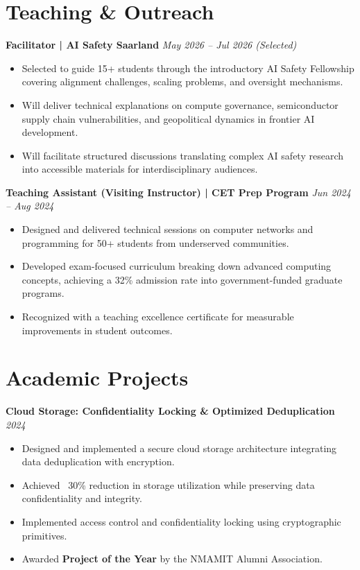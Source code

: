 \documentclass[a4paper,11pt]{article}
\begin{document}
\section{Teaching \& Outreach}
\textbf{Facilitator | AI Safety Saarland} \hfill \textit{May 2026 -- Jul 2026 (Selected)}
\begin{itemize}
    \item Selected to guide 15+ students through the introductory AI Safety Fellowship covering alignment challenges, scaling problems, and oversight mechanisms.
    \item Will deliver technical explanations on compute governance, semiconductor supply chain vulnerabilities, and geopolitical dynamics in frontier AI development.
    \item Will facilitate structured discussions translating complex AI safety research into accessible materials for interdisciplinary audiences.
\end{itemize}

\newpage

\textbf{Teaching Assistant (Visiting Instructor) | CET Prep Program} \hfill \textit{Jun 2024 -- Aug 2024}
\begin{itemize}
    \item Designed and delivered technical sessions on computer networks and programming for 50+ students from underserved communities.
    \item Developed exam-focused curriculum breaking down advanced computing concepts, achieving a 32\% admission rate into government-funded graduate programs.
    \item Recognized with a teaching excellence certificate for measurable improvements in student outcomes.
\end{itemize}

\section{Academic Projects}
\textbf{Cloud Storage: Confidentiality Locking \& Optimized Deduplication} \hfill \textit{2024}
\begin{itemize}
    \item Designed and implemented a secure cloud storage architecture integrating data deduplication with encryption.
    \item Achieved ~30\% reduction in storage utilization while preserving data confidentiality and integrity.
    \item Implemented access control and confidentiality locking using cryptographic primitives.
    \item Awarded \textbf{Project of the Year} by the NMAMIT Alumni Association.
\end{itemize}
\end{document}
